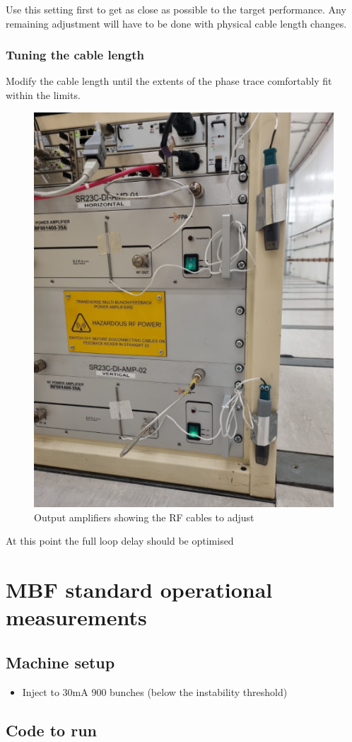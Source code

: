 \documentclass{report}
\begin{document}
Use this setting first to get as close as possible to the target performance. Any remaining adjustment will have to be done with physical cable length changes. 
\clearpage
\subsubsection{Tuning the cable length} 
Modify the cable length until the extents of the phase trace comfortably fit within the limits.  
\begin{figure}[h]
    \centering
    \includegraphics[width=0.6\linewidth]{amp_front.png}
    \caption{Output amplifiers showing the RF cables to adjust}
    \label{fig:output_amplifiers}
\end{figure}
At this point the full loop delay should be optimised
\clearpage

\section{MBF standard operational measurements}
\subsection{Machine setup} 
\begin{itemize}
    \item {Inject to 30mA 900 bunches (below the instability threshold)}
\end{itemize}

\subsection{Code to run}
\end{document}
